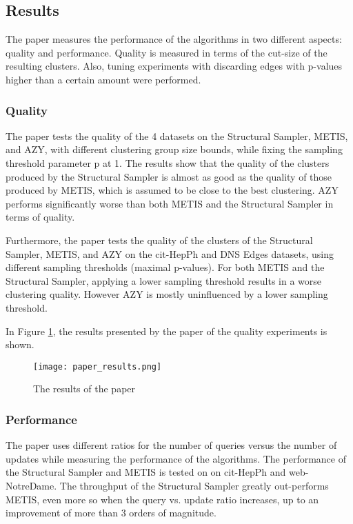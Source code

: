 \documentclass[a4paper]{article}
\begin{document}
\subsection{Results}
The paper measures the performance of the algorithms in two different aspects: quality and performance. Quality is measured in terms of the cut-size of the resulting clusters. Also, tuning experiments with discarding edges with p-values higher than a certain amount were performed.

\subsubsection{Quality}
The paper tests the quality of the 4 datasets on the Structural Sampler, METIS, and AZY, with different clustering group size bounds, while fixing the sampling threshold parameter p at 1. The results show that the quality of the clusters produced by the Structural Sampler is almost as good as the quality of those produced by METIS, which is assumed to be close to the best clustering. AZY performs significantly worse than both METIS and the Structural Sampler in terms of quality.

Furthermore, the paper tests the quality of the clusters of the Structural Sampler, METIS, and AZY on the cit-HepPh and DNS Edges datasets, using different sampling thresholds (maximal p-values). For both METIS and the Structural Sampler, applying a lower sampling threshold results in a worse clustering quality. However AZY is mostly uninfluenced by a lower sampling threshold. 

In Figure \ref{fig:paqu}, the results presented by the paper of the quality experiments is shown. 

\begin{figure}
\texttt{[image: paper\_results.png]}
\caption{The results of the paper}
\label{fig:paqu}
\end{figure}

\subsubsection{Performance}
The paper uses different ratios for the number of queries versus the number of updates while measuring the performance of the algorithms. The performance of the Structural Sampler and METIS is tested on  on cit-HepPh and web-NotreDame. The throughput of the Structural Sampler greatly out-performs METIS, even more so when the query vs. update ratio increases, up to an improvement of more than 3 orders of magnitude.
\end{document}
